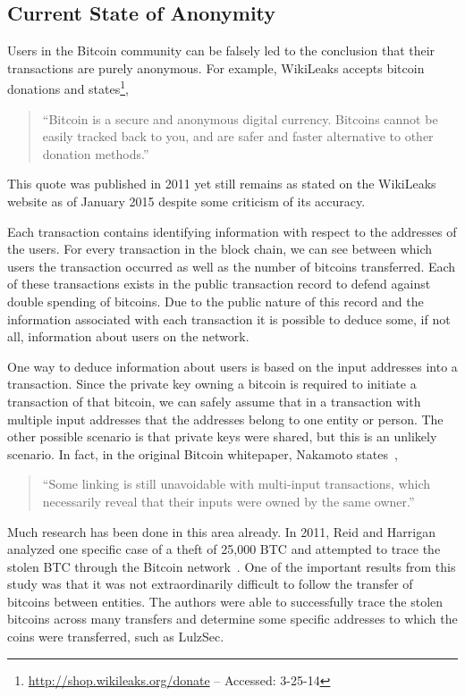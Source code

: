 \documentclass[11pt]{article}
\begin{document}
\subsection{Current State of Anonymity}
Users in the Bitcoin community can be falsely led to the conclusion that their transactions are purely anonymous. For
example, WikiLeaks accepts bitcoin donations and states\footnote{\url{http://shop.wikileaks.org/donate} -- Accessed:
3-25-14},
\begin{quote}
    ``Bitcoin is a secure and anonymous digital currency. Bitcoins cannot be easily tracked back to you, and are safer
    and faster alternative to other donation methods.''
\end{quote}
This quote was published in 2011 yet still remains as stated on the WikiLeaks website as of January 2015 despite some
criticism of its accuracy.

Each transaction contains identifying information with respect to the addresses of the users. For every transaction in
the block chain, we can see between which users the transaction occurred as well as the number of bitcoins transferred.
Each of these transactions exists in the public transaction record to defend against double spending of bitcoins. Due to
the public nature of this record and the information associated with each transaction it is possible to deduce some, if
not all, information about users on the network.

One way to deduce information about users is based on the input addresses into a transaction. Since the private key
owning a bitcoin is required to initiate a transaction of that bitcoin, we can safely assume that in a transaction with
multiple input addresses that the addresses belong to one entity or person. The other possible scenario is that private
keys were shared, but this is an unlikely scenario. In fact, in the original Bitcoin whitepaper, Nakamoto
states~\cite{nakamoto08},
    \begin{quote}
        ``Some linking is still unavoidable with multi-input transactions, which
        necessarily reveal that their inputs were owned by the same owner.''
    \end{quote}

Much research has been done in this area already. In 2011, Reid and Harrigan analyzed one specific case of a theft of
25,000 BTC and attempted to trace the stolen BTC through the Bitcoin network~\cite{reid11}. One of the important results
from this study was that it was not extraordinarily difficult to follow the transfer of bitcoins between entities. The
authors were able to successfully trace the stolen bitcoins across many transfers and determine some specific addresses
to which the coins were transferred, such as LulzSec.
\end{document}
